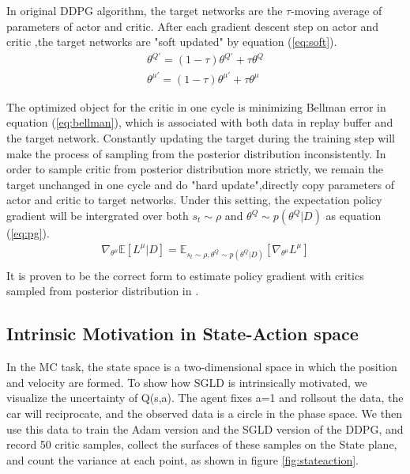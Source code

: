 In original DDPG algorithm, the target networks are the $\tau$-moving average of parameters of actor and critic. After each gradient descent step on actor and critic ,the target networks are "soft updated" by equation (\ref{eq:soft}).
\begin{equation}
\label{eq:soft} 
\begin{aligned}
\theta^{Q'} = (1-\tau)\theta^{Q'}+\tau\theta^Q\\
\theta^{\mu'} = (1-\tau)\theta^{\mu'}+\tau\theta^\mu
\end{aligned}
\end{equation}

The optimized object for the critic in one cycle is minimizing Bellman error in equation (\ref{eq:bellman}), which is associated with both data in replay buffer and the target network. Constantly updating the target during the training step will make the process of sampling from the posterior distribution inconsistently. In order to sample critic from posterior distribution more strictly, we remain the target unchanged in one cycle and do "hard update",directly copy parameters of actor and critic to target networks. Under this setting, the expectation policy gradient will be intergrated over both $s_t\sim\rho$ and $\theta^Q\sim p(\theta^Q|D)$ as equation (\ref{eq:pg}). 
\begin{equation}
   \label{eq:pg} 
   \begin{aligned}
   \nabla_{\theta^\mu}\mathbb{E}[L^\mu|D] = \mathbb{E}_{s_t\sim\rho,\theta^Q\sim p(\theta^Q|D)}[\nabla_{\theta^\mu}L^\mu]\\
   \end{aligned}
\end{equation}
It is proven to be the correct form to estimate policy gradient with critics sampled from posterior distribution in \cite{dropoutInference}.

\subsection{Intrinsic Motivation in State-Action space}
In the MC task, the state space is a two-dimensional space in which the position and velocity are formed. To show how SGLD is intrinsically motivated, we visualize the uncertainty of Q(s,a). The agent fixes a=1 and rollsout the data, the car will reciprocate, and the observed data is a circle in the phase space. We then use this data to train the Adam version and the SGLD version of the DDPG, and record 50 critic samples, collect the surfaces of these samples on the State plane, and count the variance at each point, as shown in figure \ref{fig:stateaction}.

